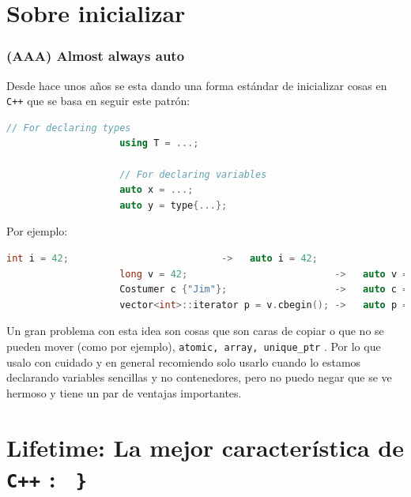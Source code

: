 \documentclass[12pt, fleqn]{report}                             %
\theoremstyle{break}                                            %
\newcommand{\textCode}[1]  { \texttt{#1} }                      %
\newcommand{\Cpp}{\ignorespaces\textCode{C++}}                  %
\begin{document}
        \section{Sobre inicializar}  

            \subsubsection{(AAA) Almost always auto}

                Desde hace unos años se esta dando una forma estándar de inicializar cosas en \Cpp
                que se basa en seguir este patrón:
                \begin{lstlisting}[language=C++, gobble=20]
                    // For declaring types
                    using T = ...;

                    // For declaring variables
                    auto x = ...;
                    auto y = type{...};
                \end{lstlisting}

                Por ejemplo:
                \begin{lstlisting}[language=C++, gobble=20]
                    int i = 42;                           ->   auto i = 42;
                    long v = 42;                          ->   auto v = long {42};
                    Costumer c {"Jim"};                   ->   auto c = Costumer {"Jim"};
                    vector<int>::iterator p = v.cbegin(); ->   auto p = v.cbegin();
                \end{lstlisting}

                Un gran problema con esta idea son cosas que son caras de copiar o que no se pueden mover
                (como por ejemplo), \textCode{atomic, array, unique\_ptr}. Por lo que usalo con cuidado
                y en general recomiendo solo usarlo cuando lo estamos declarando variables sencillas y no 
                contenedores, pero no puedo negar que se ve hermoso y tiene un par de ventajas importantes.

            
        \clearpage
        \section{Lifetime: La mejor característica de \Cpp: \textCode{ \} } }     
        
\end{document}
